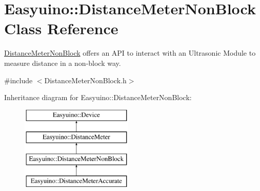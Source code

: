 \hypertarget{class_easyuino_1_1_distance_meter_non_block}{}\section{Easyuino\+:\+:Distance\+Meter\+Non\+Block Class Reference}
\label{class_easyuino_1_1_distance_meter_non_block}


\hyperlink{class_easyuino_1_1_distance_meter_non_block}{Distance\+Meter\+Non\+Block} offers an A\+PI to interact with an Ultrasonic Module to measure distance in a non-\/block way.  




{\ttfamily \#include $<$Distance\+Meter\+Non\+Block.\+h$>$}

Inheritance diagram for Easyuino\+:\+:Distance\+Meter\+Non\+Block\+:\begin{figure}[H]
\begin{center}
\leavevmode
\includegraphics[height=4.000000cm]{class_easyuino_1_1_distance_meter_non_block}
\end{center}
\end{figure}
